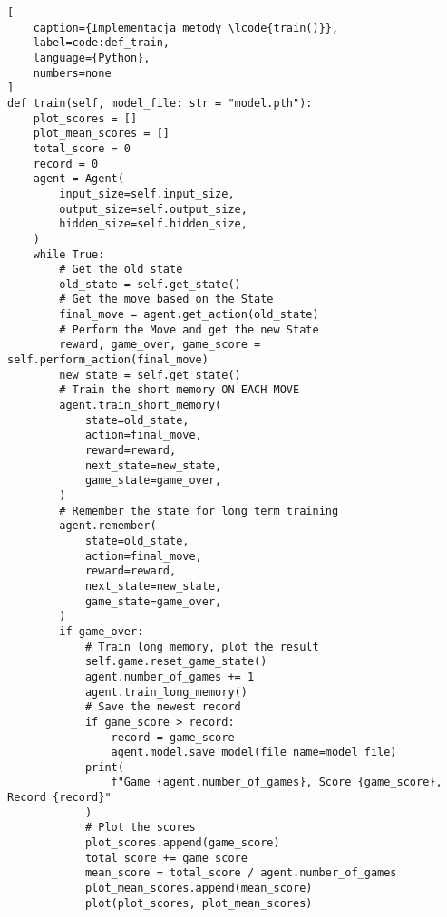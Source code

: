 \begin{onepage}
    \begin{lstlisting}[
    caption={Implementacja metody \lcode{train()}},
    label=code:def_train,
    language={Python},
    numbers=none
]
def train(self, model_file: str = "model.pth"):
    plot_scores = []
    plot_mean_scores = []
    total_score = 0
    record = 0
    agent = Agent(
        input_size=self.input_size,
        output_size=self.output_size,
        hidden_size=self.hidden_size,
    )
    while True:
        # Get the old state
        old_state = self.get_state()
        # Get the move based on the State
        final_move = agent.get_action(old_state)
        # Perform the Move and get the new State
        reward, game_over, game_score = self.perform_action(final_move)
        new_state = self.get_state()
        # Train the short memory ON EACH MOVE
        agent.train_short_memory(
            state=old_state,
            action=final_move,
            reward=reward,
            next_state=new_state,
            game_state=game_over,
        )
        # Remember the state for long term training
        agent.remember(
            state=old_state,
            action=final_move,
            reward=reward,
            next_state=new_state,
            game_state=game_over,
        )
        if game_over:
            # Train long memory, plot the result
            self.game.reset_game_state()
            agent.number_of_games += 1
            agent.train_long_memory()
            # Save the newest record
            if game_score > record:
                record = game_score
                agent.model.save_model(file_name=model_file)
            print(
                f"Game {agent.number_of_games}, Score {game_score}, Record {record}"
            )
            # Plot the scores
            plot_scores.append(game_score)
            total_score += game_score
            mean_score = total_score / agent.number_of_games
            plot_mean_scores.append(mean_score)
            plot(plot_scores, plot_mean_scores)
    \end{lstlisting}
\end{onepage}

